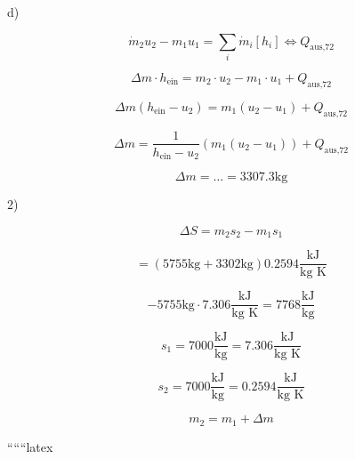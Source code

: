 d)

\[
\dot{m}_2 u_2 - m_1 u_1 = \sum_i \dot{m}_i [h_i] \iff Q_{\text{aus,72}}
\]

\[
\Delta m \cdot h_{\text{ein}} = m_2 \cdot u_2 - m_1 \cdot u_1 + Q_{\text{aus,72}}
\]

\[
\Delta m (h_{\text{ein}} - u_2) = m_1 (u_2 - u_1) + Q_{\text{aus,72}}
\]

\[
\Delta m = \frac{1}{h_{\text{ein}} - u_2} (m_1 (u_2 - u_1)) + Q_{\text{aus,72}}
\]

\[
\Delta m = \dots = 3307.3 \text{kg}
\]

2)

\[
\Delta S = m_2 s_2 - m_1 s_1
\]

\[
= (5755 \text{kg} + 3302 \text{kg}) 0.2594 \frac{\text{kJ}}{\text{kg K}}
\]

\[
- 5755 \text{kg} \cdot 7.306 \frac{\text{kJ}}{\text{kg K}} = 7768 \frac{\text{kJ}}{\text{kg}}
\]

\[
s_1 = 7000 \frac{\text{kJ}}{\text{kg}} = 7.306 \frac{\text{kJ}}{\text{kg K}}
\]

\[
s_2 = 7000 \frac{\text{kJ}}{\text{kg}} = 0.2594 \frac{\text{kJ}}{\text{kg K}}
\]

\[
m_2 = m_1 + \Delta m
\]

``````latex